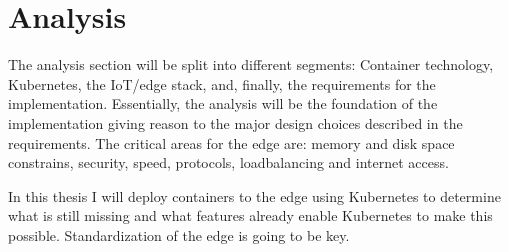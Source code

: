 \clearpage
\section{Analysis} \label{sec:analysis}
The analysis section will be split into different segments: Container technology, Kubernetes, the IoT/edge stack, and, finally, the requirements for the implementation. Essentially, the analysis will be the foundation of the implementation giving reason to the major design choices described in the requirements. The critical areas for the edge are: memory and disk space constrains, security, speed, protocols, loadbalancing and internet access.

In this thesis I will deploy containers to the edge using Kubernetes to determine what is still missing and what features already enable Kubernetes to make this possible. Standardization of the edge is going to be key.








